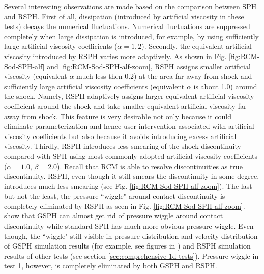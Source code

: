 Several interesting observations are made based on the comparison between SPH and RSPH.
First of all, dissipation (introduced by artificial viscosity in these tests) decays the numerical fluctuations. Numerical fluctuations are suppressed completely when large dissipation is introduced, for example, by using sufficiently large artificial viscosity coefficients ($\alpha=1,2$).
Secondly, the equivalent artificial viscosity introduced by RSPH varies more adaptively.
As shown in Fig. \ref{fig:RCM-Sod-SPH-alf} and \ref{fig:RCM-Sod-SPH-alf-zoom}, RSPH assigns smaller artificial viscosity (equivalent $\alpha$ much less then 0.2) at the area far away from shock and sufficiently large artificial viscosity coefficients (equivalent $\alpha$ is about 1.0) around the shock. Namely, RSPH adaptively assigns larger equivalent artificial viscosity coefficient around the shock and take smaller equivalent artificial viscosity far away from shock. This feature is very desirable not only because it could eliminate parameterization and hence user intervention associated with artificial viscosity coefficients but also because it avoids introducing excess artificial viscosity.
Thirdly, RSPH introduces less smearing of the shock discontinuity compared with SPH using most commonly adopted artificial viscosity coefficients ($\alpha=1.0$, $\beta=2.0$). Recall that RCM is able to resolve discontinuities as true discontinuity. RSPH, even though it still smears the discontinuity in some degree, introduces much less smearing (see Fig. \ref{fig:RCM-Sod-SPH-alf-zoom}).
The last but not the least, the pressure ``wiggle" around contact discontinuity is completely eliminated by RSPH as seen in Fig. \ref{fig:RCM-Sod-SPH-alf-zoom}. \citet{inutsuka2002reformulation} show that GSPH can almost get rid of pressure wiggle around contact discontinuity while standard SPH has much more obvious pressure wiggle. 
 Even though, the ``wiggle" still visible in pressure distribution and velocity distribution of GSPH simulation results (for example, see figures in \citep{puri2014comparison}) and RSPH simulation results of other tests (see section \ref{sec:comprehensive-1d-tests}). Pressure wiggle in test 1, however, is completely eliminated by both GSPH and RSPH.

